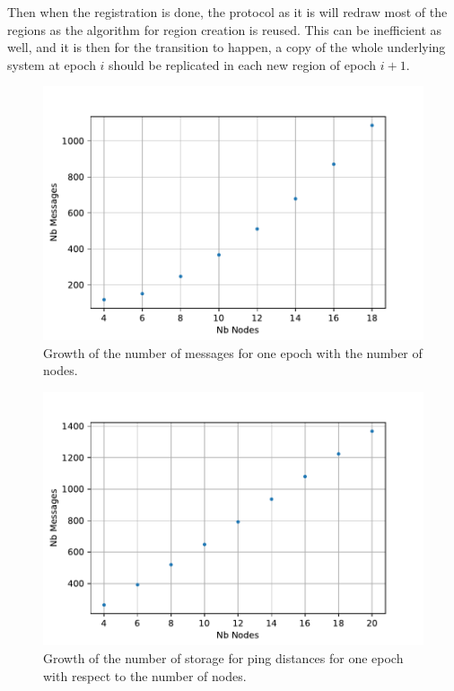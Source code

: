 \documentclass[a4paper,11pt,oneside]{report}
\begin{document}
Then when the registration is done, the protocol as it is will redraw most of
the regions as the algorithm for region creation is reused. This can be
inefficient as well, and it is then for the transition to happen, a copy of the
whole underlying system at epoch $i$ should be replicated in each new region of
epoch $i+1$.

\begin{figure}[!h] 
\centering
\includegraphics[width=350pt]{figures/messages-plot}
\caption{Growth of the number of messages for one epoch with the number of nodes.}
\label{fig:messages-plot}
\end{figure}

\begin{figure}[!h] 
\centering
\includegraphics[width=350pt]{figures/storage-plot}
\caption{Growth of the number of storage for ping distances for one epoch with
    respect to the number of nodes.} \label{fig:storage-plot}
\end{figure}
\end{document}
